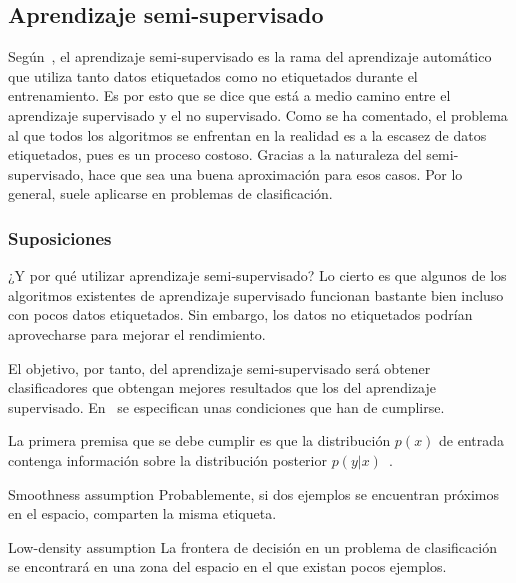 
\subsection{Aprendizaje semi-supervisado}
\label{aprendizaje-semi-supervisado}

Según~\cite{vanEngelen2020}, el aprendizaje semi-supervisado es la rama del
aprendizaje automático que utiliza tanto datos etiquetados como no etiquetados 
durante el entrenamiento. Es por esto que se dice que está a medio camino entre 
el aprendizaje supervisado y el no supervisado. Como se ha comentado, el problema
al que todos los algoritmos se enfrentan en la realidad es a la escasez de datos 
etiquetados, pues es un proceso costoso. Gracias a la naturaleza del semi-supervisado,
hace que sea una buena aproximación para esos casos. Por lo general, suele aplicarse 
en problemas de clasificación.

\subsubsection{Suposiciones}
¿Y por qué utilizar aprendizaje semi-supervisado? Lo cierto es que algunos
de los algoritmos existentes de aprendizaje supervisado funcionan bastante bien
incluso con pocos datos etiquetados. Sin embargo, los datos no etiquetados podrían
aprovecharse para mejorar el rendimiento.

El objetivo, por tanto, del aprendizaje semi-supervisado será obtener clasificadores
que obtengan mejores resultados que los del aprendizaje supervisado. En~\cite{vanEngelen2020}
se especifican unas condiciones que han de cumplirse.

La primera premisa que se debe cumplir es que la distribución $p(x)$ de entrada contenga
información sobre la distribución posterior $p(y|x)$~\cite{vanEngelen2020}.

\begin{mainbox}{Smoothness assumption}
    Probablemente, si dos ejemplos se encuentran próximos en el espacio, comparten
    la misma etiqueta.
\end{mainbox}

\medskip

\begin{mainbox}{Low-density assumption}
    La frontera de decisión en un problema de clasificación se encontrará en una zona del espacio
    en el que existan pocos ejemplos.
\end{mainbox}

